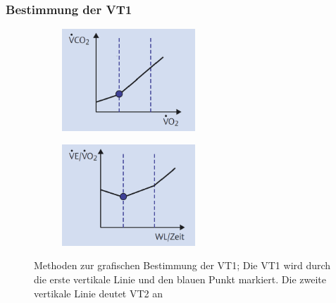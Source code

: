 \subsubsection{Bestimmung der VT1}

\begin{figure}[H]
	\centering
	\begin{subfigure}[c]{0.45\textwidth}
		\centering
		\includegraphics[width=50mm]{Bilder/vslope.png}
		\label{subpic:pic5}
	\end{subfigure}%
	\hfil
	\begin{subfigure}[c]{0.45\textwidth}
		\centering
		\includegraphics[width=50mm]{Bilder/eqo2.png}
		\label{subpic:pic6}
	\end{subfigure}
	\caption[Methoden zur grafischen Bestimmung der VT1]{Methoden zur grafischen Bestimmung der VT1; Die VT1 wird durch die erste vertikale Linie und den blauen Punkt markiert. Die zweite vertikale Linie deutet VT2 an~\cite{Kroidl.2015}}
	\label{pic:pic4}
\end{figure}

